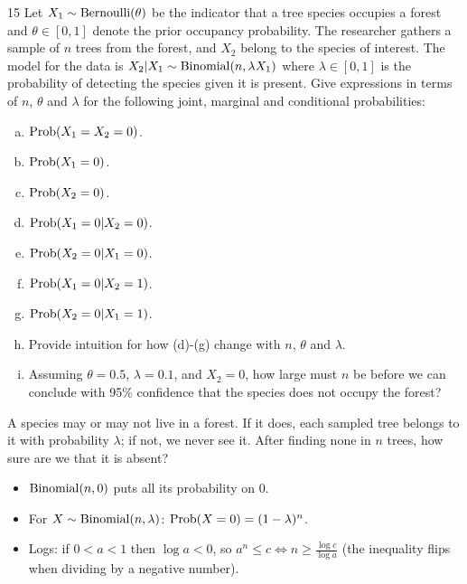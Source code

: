 \documentclass[11pt]{article}
\begin{document}
\begin{problem}{15}
Let $X_1\sim\mathrm{Bernoulli}(\theta)$ be the indicator that a tree species occupies a forest and $\theta\in[0,1]$ denote the prior occupancy probability. The researcher gathers a sample of $n$ trees from the forest, and $X_2$ belong to the species of interest. The model for the data is $X_2|X_1\sim\mathrm{Binomial}(n,\lambda X_1)$ where $\lambda\in[0,1]$ is the probability of detecting the species given it is present. Give expressions in terms of $n$, $\theta$ and $\lambda$ for the following joint, marginal and conditional probabilities:
\begin{enumerate}[(a)]
\item $\mathrm{Prob}(X_1=X_2=0)$.
\item $\mathrm{Prob}(X_1=0)$.
\item $\mathrm{Prob}(X_2=0)$.
\item $\mathrm{Prob}(X_1=0|X_2=0)$.
\item $\mathrm{Prob}(X_2=0|X_1=0)$.
\item $\mathrm{Prob}(X_1=0|X_2=1)$.
\item $\mathrm{Prob}(X_2=0|X_1=1)$.
\item Provide intuition for how (d)-(g) change with $n$, $\theta$ and $\lambda$.
\item Assuming $\theta=0.5$, $\lambda=0.1$, and $X_2=0$, how large must $n$ be before we can conclude with 95\% confidence that the species does not occupy the forest?
\end{enumerate}
\end{problem}

\begin{restate}
A species may or may not live in a forest. If it does, each sampled tree belongs to it with probability $\lambda$; if not, we never see it. After finding none in $n$ trees, how sure are we that it is absent?
\end{restate}

\begin{recall}
\begin{itemize}
\item $\mathrm{Binomial}(n,0)$ puts all its probability on 0.
\item For $X\sim\mathrm{Binomial}(n,\lambda)$: $\mathrm{Prob}(X=0)=(1-\lambda)^n$.
\item Logs: if $0<a<1$ then $\log a<0$, so $a^n\le c\iff n\ge\frac{\log c}{\log a}$ (the inequality flips when dividing by a negative number).
\end{itemize}
\end{recall}
\end{document}
